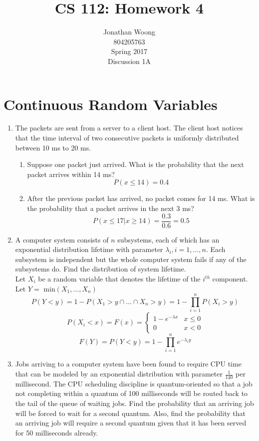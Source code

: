 \documentclass[10.5pt,letterpaper]{article}
\date{\displaydate{date}}
\begin{document}
\title{CS 112: Homework 4}
\author{
	Jonathan Woong\\
	804205763\\
	Spring 2017\\
	Discussion 1A}
\maketitle
\pagebreak


\section{Continuous Random Variables}
\begin{enumerate}[label=\textbf{Problem \arabic*.}]
\item The packets are sent from a server to a client host. The client host notices that the time interval of two consecutive packets is uniformly distributed between 10 ms to 20 ms.
	\begin{enumerate}[label=\alph*)]
	\item Suppose one packet just arrived. What is the probability that the next packet arrives within 14 ms?
	\[P(x\leq 14)=0.4\]
	\item After the previous packet has arrived, no packet comes for 14 ms. What is the probability that a packet arrives in the next 3 ms?
	\[P(x\leq 17 | x \geq 14) = \frac{0.3}{0.6} = 0.5 \]
	\end{enumerate}
\item A computer system consists of $n$ subsystems, each of which has an exponential distribution lifetime with parameter $\lambda_i,i=1,\dots,n.$ Each subsystem is independent but the whole computer system fails if any of the subsystems do. Find the distribution of system lifetime.\\
Let $X_i$ be a random variable that denotes the lifetime of the $i^{th}$ component.\\
Let $Y = $ min$(X_1,\dots,X_n)$
\[P(Y < y) = 1 - P(X_1 > y \cap \dots \cap X_n > y) = 1 - \prod_{i=1}^{n}P(X_i>y)\]
\[P(X_i<x)=F(x)=
\begin{cases}
1-e^{-\lambda x} & x \leq 0 \\
0 & x < 0
\end{cases}\]
\[F(Y)=P(Y<y)=1-\prod_{i=1}^{n}e^{-\lambda_i y}\]
\item Jobs arriving to a computer system have been found to require CPU time that can be modeled by an exponential distribution with parameter $\frac{1}{140}$ per millisecond. The CPU scheduling discipline is  quantum-oriented so that a job not completing within a quantum of 100 milliseconds will be routed back to the tail of the queue of waiting jobs. Find the probability that an arriving job will be forced to wait for a second quantum. Also, find the probability that an arriving job will require a second quantum given that it has been served for 50 milliseconds already.

\end{enumerate}
\end{document}
